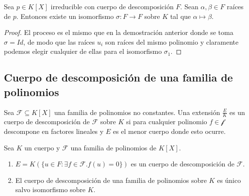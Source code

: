 \begin{corollary}
Sea $p \in K[X]$ irreducible con cuerpo de descomposición $F$. Sean $\alpha,\beta \in F$ raíces de $p$. Entonces existe un isomorfismo $\sigma:F \to F$ sobre $K$ tal que $\alpha \mapsto \beta$. 
\end{corollary}
\begin{proof}
El proceso es el mismo que en la demostración anterior donde se toma $\sigma = Id$, de modo que las raíces $u_i$ son raíces del mismo polinomio y claramente podemos elegir cualquier de ellas para el isomorfismo $\sigma_1$.
\end{proof}

\subsection{Cuerpo de descomposición de una familia de polinomios}

\begin{definition}
Sea $\mathcal{F} \subseteq K[X]$ una familia de polinomios no constantes. Una extensión $\frac{E}{K}$ es un cuerpo de descomposición de $\mathcal{F}$ sobre $K$ si para cualquier polinomio $f \in \mathcal{f}$ descompone en factores lineales y $E$ es el menor cuerpo donde esto ocurre.
\end{definition}

\begin{proposition}
Sea $K$ un cuerpo y $\mathcal{F}$ una familia de polinomios de $K[X]$.

\begin{enumerate}
\item $E = K(\{u \in F:\exists f \in \mathcal{F}. f(u) = 0\})$ es un cuerpo de descomposición de $\mathcal{F}$.
\item El cuerpo de descomposición de una familia de polinomios sobre $K$ es único salvo isomorfismo sobre $K$.  
\end{enumerate}
\end{proposition}




